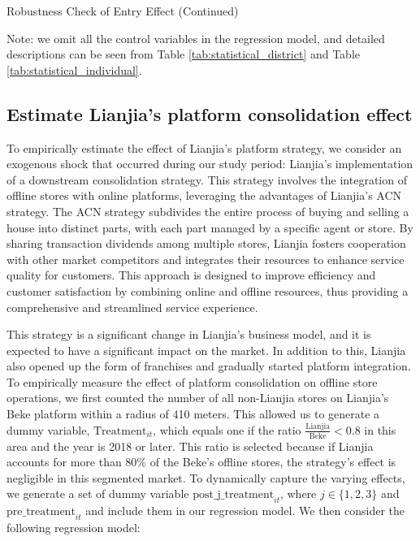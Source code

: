 \documentclass[11pt]{article}
\begin{document}
\begin{table}
  \begin{center}
    \begin{scriptsize}
      \caption{Robustness Check of Entry Effect (Continued)}
      \label{tab:entry_effect_robustness_2}
      
    
    Note: we omit all the control variables in the regression model, and detailed descriptions can be seen from Table \ref{tab:statistical_district} and Table \ref{tab:statistical_individual}.
    \end{scriptsize}
  \end{center}
\end{table}

\subsection{Estimate Lianjia's platform consolidation effect} \label{subsec:acn_strategy}

To empirically estimate the effect of Lianjia's platform strategy, we consider an exogenous shock that occurred during our study period: Lianjia's implementation of a downstream consolidation strategy. This strategy involves the integration of offline stores with online platforms, leveraging the advantages of Lianjia's ACN strategy. The ACN strategy subdivides the entire process of buying and selling a house into distinct parts, with each part managed by a specific agent or store. By sharing transaction dividends among multiple stores, Lianjia fosters cooperation with other market competitors and integrates their resources to enhance service quality for customers. This approach is designed to improve efficiency and customer satisfaction by combining online and offline resources, thus providing a comprehensive and streamlined service experience. 

This strategy is a significant change in Lianjia's business model, and it is expected to have a significant impact on the market. In addition to this, Lianjia also opened up the form of franchises and gradually started platform integration. To empirically measure the effect of platform consolidation on offline store operations, we first counted the number of all non-Lianjia stores on Lianjia's Beke platform within a radius of 410 meters. This allowed us to generate a dummy variable, $\text{Treatment}_{it}$, which equals one if the ratio $\frac{\text{Lianjia}}{\text{Beke}} < 0.8$ in this area and the year is 2018 or later. This ratio is selected because if Lianjia accounts for more than 80\% of the Beke's offline stores, the strategy's effect is negligible in this segmented market. To dynamically capture the varying effects, we generate a set of dummy variable $\text{post\_j\_treatment}_{it}$, where $j \in \{1, 2, 3\}$ and $\text{pre\_treatment}_{it}$ and include them in our regression model. We then consider the following regression model:
\end{document}
